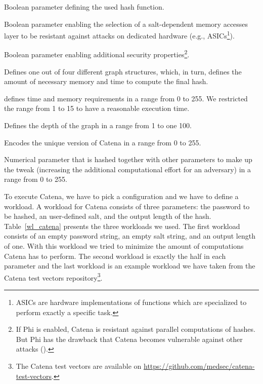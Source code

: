 \begin{description}[style=multiline,leftmargin=7em]
	\item [Hash] Boolean parameter defining the used hash function.
	\item [Gamma] Boolean parameter enabling the selection of a salt-dependent memory accesses layer to be resistant against attacks on dedicated hardware (e.g., ASICs\footnote{ASICs are hardware implementations of functions which are specialized to perform exactly a specific task.}).
	\item [Phi] Boolean parameter enabling additional security properties\footnote{If Phi is enabled, Catena is resistant against parallel computations of hashes. But Phi has the drawback that Catena becomes vulnerable against other attacks (\cite{10.1007/978-3-319-29938-9_7}).}.
	\item [Graph] Defines one out of four different graph structures, which, in turn, defines the amount of necessary memory and time to compute the final hash.
	\item [Garlic] defines time and memory requirements in a range from 0 to 255. We restricted the range from 1 to 15 to have a reasonable execution time.
	\item [Lambda] Defines the depth of the graph in a range from 1 to one 100.
	\item [VID] Encodes the unique version of Catena in a range from 0 to 255.
	\item [D] Numerical parameter that is hashed together with other parameters to make up the tweak (increasing the additional computational effort for an adversary) in a range from 0 to 255.
\end{description}

To execute Catena, we have to pick a configuration and we have to define a workload. A workload for Catena consists of three parameters: the password to be hashed, an user-defined salt, and the output length of the hash. Table~\ref{wl_catena} presents the three workloads we used. The first workload consists of an empty password string, an empty salt string, and an output length of one. With this workload we tried to minimize the amount of computations Catena has to perform. The second workload is exactly the half in each parameter and the last workload is an example workload we have taken from the Catena test vectors repository\footnote{The Catena test vectors are available on \url{https://github.com/medsec/catena-test-vectors}.}.

